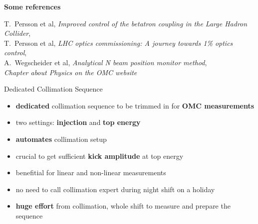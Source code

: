 \documentclass[4pt,usenames,dvipsnames,aspectratio=169,table]{beamer}
\newcommand{\highl}[1]{\textbf{#1}}
\begin{document}
\begin{frame}
\begin{minipage}{0.44\linewidth}
        \textbf{Some references}
        
        \tiny
        T.~Persson et al,
        \emph{Improved control of the betatron coupling in the Large Hadron Collider},
        \href{https://cds.cern.ch/record/2135848?ln=en}{\faExternalLink*}
        \\[-0.5em]
        
        T.~Persson et al,
        \emph{LHC optics commissioning: A journey towards 1\% optics control},
        \href{https://journals.aps.org/prab/abstract/10.1103/PhysRevAccelBeams.20.061002}{\faExternalLink*}
        \\[-0.5em]
        
        A.~Wegscheider et al,
        \emph{Analytical N beam position monitor method},
        \href{https://journals.aps.org/prab/abstract/10.1103/PhysRevAccelBeams.20.111002}{\faExternalLink*}
        \\[-0.5em]
        
        \emph{Chapter about Physics on the OMC website}
        \href{https://pylhc.github.io/measurements/physics}{\faExternalLink*}
        
        \normalsize
        
    \end{minipage}
\end{frame}


\begin{frame}{Dedicated Collimation Sequence}

    \begin{itemize}
        \item \highl{dedicated} collimation sequence to be trimmed in for \highl{OMC measurements}
        \item two settings: \highl{injection} and \highl{top energy}
        \item \highl{automates} collimation setup
        \item crucial to get sufficient \highl{kick amplitude} at top energy
        \item benefitial for linear and non-linear measurements
        \item no need to call collimation expert during night shift on a holiday
        \item \highl{huge effort} from collimation, whole shift to measure and prepare the sequence
    \end{itemize}

\end{frame}
\end{document}
